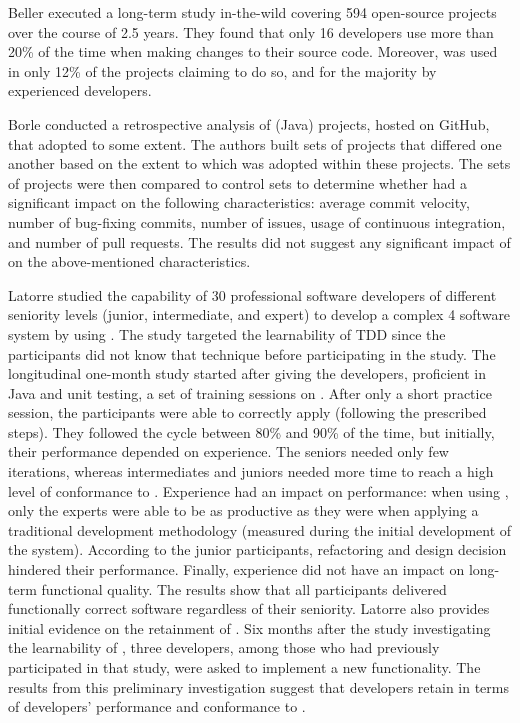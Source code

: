 Beller \etal \cite{DBLP:journals/tse/BellerGPPAZ19} executed a long-term study in-the-wild covering 594 open-source projects over the course of 2.5 years. They found that only 16 developers use \tdd more than 20\% of the time when making changes to their source code.
Moreover, \tdd was used in only 12\% of the projects claiming to do so, and for the majority by experienced developers.

Borle \etal \cite{DBLP:journals/ese/BorleFSGH18} conducted a retrospective analysis of (Java) projects, hosted on GitHub, that adopted \tdd to some extent. The authors built sets of \tdd projects that differed one another based on the extent to which \tdd was adopted within these projects. The sets of \tdd projects were then compared to control sets to determine whether \tdd had a significant impact on the following characteristics: average commit velocity, number of bug-fixing commits, number of issues, usage of continuous integration, and number of pull requests. The results did not suggest any significant impact of \tdd on the above-mentioned characteristics.

Latorre \cite{DBLP:journals/tse/Latorre14} studied the capability of 30 professional software developers of different seniority levels (junior, intermediate, and expert) to develop a complex 4 software system by using \tdd. The study targeted the learnability of TDD since the participants did not know that technique before participating in the study. 
The longitudinal one-month study started after giving the developers, proficient in Java and unit testing, a set of training sessions on \tdd. After only a short practice session, the participants were able to correctly apply \tdd (\eg following the prescribed steps). They followed the \tdd cycle between 80\% and 90\% of the time, but initially, their performance depended on experience. The seniors needed only few iterations, whereas intermediates and juniors needed more time to reach a high level of conformance to \tdd. 
Experience had an impact on performance: when using \tdd, only the experts were able to be as productive as they were when applying a traditional development methodology (measured during the initial development of the system). According to the junior participants, refactoring and design decision hindered their performance. Finally, experience did not have an impact on long-term functional quality. 
The results show that all participants delivered functionally correct software regardless of their seniority. Latorre \cite{DBLP:journals/tse/Latorre14} also provides initial evidence on the retainment of \tdd. Six months after the study investigating the learnability of \tdd, three developers, among those who had previously participated in that study, were asked to implement a new functionality. The results from this preliminary investigation suggest that developers retain \tdd in terms of developers' performance and conformance to \tdd.


